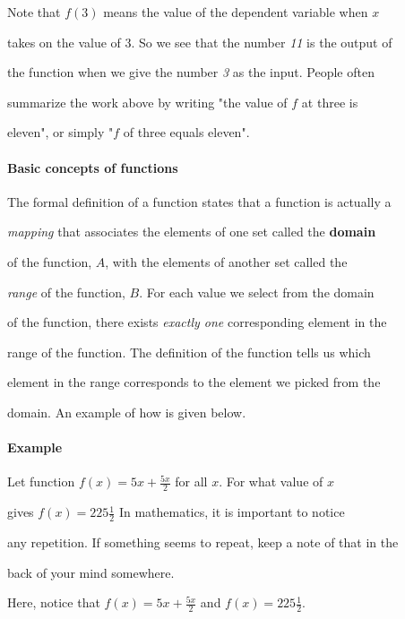 Note that $f(3)$ means the value of the dependent variable when $x$

takes on the value of 3. So we see that the number \textit{11} is the output of

the function when we give the number \textit{3} as the input. People often

summarize the work above by writing "the value of $f$ at three is

eleven", or simply "$f$ of three equals eleven".



\paragraph{Basic concepts of functions}



The formal definition of a function states that a function is actually a

\textit{mapping} that associates the elements of one set called the \textbf{domain}

of the function, $A$, with the elements of another set called the

\textit{range} of the function, $B$. For each value we select from the domain

of the function, there exists \textit{exactly one} corresponding element in the

range of the function. The definition of the function tells us which

element in the range corresponds to the element we picked from the

domain. An example of how is given below.



\paragraph{Example}



Let function $f(x)=5x+\frac{5x}{2}$ for all $x$. For what value of $x$

gives $f(x)=225\frac{1}{2}$ In mathematics, it is important to notice

any repetition. If something seems to repeat, keep a note of that in the

back of your mind somewhere.



Here, notice that $f(x)=5x+\frac{5x}{2}$ and $f(x)=225\frac{1}{2}$.

